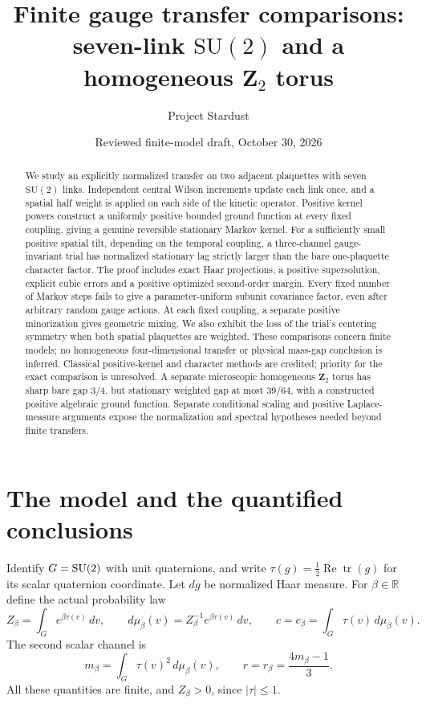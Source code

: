 \documentclass[11pt]{article}
\title{Finite gauge transfer comparisons:\\
seven-link $\mathrm{SU}(2)$ and a homogeneous $\mathbf Z_2$ torus}
\author{Project Stardust}
\date{Reviewed finite-model draft, October 30, 2026}
\newcommand{\R}{\mathbb R}\newcommand{\E}{\mathbb E}
\begin{document}
\maketitle
\begin{abstract}
We study an explicitly normalized transfer on two adjacent plaquettes
with seven $\mathrm{SU}(2)$ links. Independent central Wilson increments
update each link once, and a spatial half weight is applied on each
side of the kinetic operator. Positive kernel powers construct a
uniformly positive bounded ground function at every fixed coupling,
giving a genuine reversible stationary Markov kernel. For a sufficiently
small positive spatial tilt, depending on the temporal coupling, a
three-channel gauge-invariant trial has normalized stationary lag
strictly larger than the bare one-plaquette character factor. The
proof includes exact Haar projections, a positive supersolution,
explicit cubic errors and a positive optimized second-order margin.
Every fixed number of Markov steps fails to give a parameter-uniform
subunit covariance factor, even after arbitrary random gauge actions.
At each fixed coupling, a separate positive minorization gives geometric
mixing. We also exhibit the loss of the trial's centering symmetry when
both spatial plaquettes are weighted. These comparisons concern finite models;
no homogeneous four-dimensional transfer or physical
mass-gap conclusion is inferred. Classical positive-kernel and character
methods are credited; priority for the exact comparison is unresolved. A separate microscopic homogeneous $\mathbf Z_2$ torus has sharp bare gap $3/4$, but stationary weighted gap at most $39/64$, with a constructed positive algebraic ground function. Separate
conditional scaling and positive Laplace-measure arguments expose the
normalization and spectral hypotheses needed beyond finite transfers.
\end{abstract}

\section{The model and the quantified conclusions}
Identify $G=\mathrm{SU}(2)$ with unit quaternions, and write
$\tau(g)=\frac12\operatorname{Re}\operatorname{tr}(g)$ for its scalar
quaternion coordinate. Let $dg$ be normalized Haar measure. For
$\beta\in\R$ define the actual probability law
\begin{equation}\label{eq:increment}
 Z_\beta=\int_G e^{\beta\tau(v)}\,dv,\qquad
 d\mu_\beta(v)=Z_\beta^{-1}e^{\beta\tau(v)}\,dv,\qquad
 c=c_\beta=\int_G\tau(v)\,d\mu_\beta(v).
\end{equation}
The second scalar channel is
\begin{equation}\label{eq:r}
 m_\beta=\int_G\tau(v)^2\,d\mu_\beta(v),\qquad
 r=r_\beta=\frac{4m_\beta-1}{3}.
\end{equation}
All these quantities are finite, and $Z_\beta>0$, since $|\tau|\leq1$.
\end{document}
